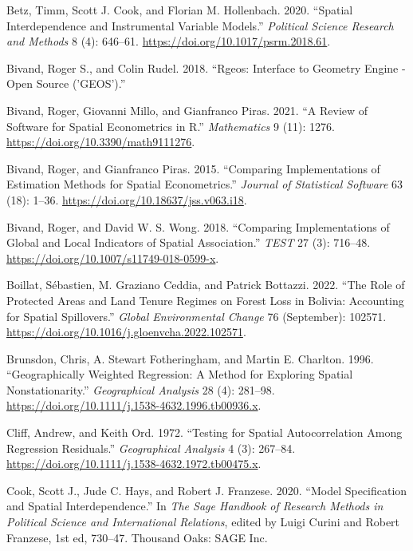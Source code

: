 \documentclass[
  letterpaper,
  DIV=11,
  numbers=noendperiod]{scrreprt}
\newlength{\cslhangindent}
\newlength{\cslentryspacingunit} %
\newenvironment{CSLReferences}[2] %
 {%
  \setlength{\parindent}{0pt}
  \ifodd #1
  \let\oldpar\par
  \def\par{\hangindent=\cslhangindent\oldpar}
  \fi
  \setlength{\parskip}{#2\cslentryspacingunit}
 }%
 {}
\begin{document}
\begin{CSLReferences}{1}{0}
\leavevmode{}%
Betz, Timm, Scott J. Cook, and Florian M. Hollenbach. 2020. {``Spatial
Interdependence and Instrumental Variable Models.''} \emph{Political
Science Research and Methods} 8 (4): 646--61.
\url{https://doi.org/10.1017/psrm.2018.61}.

\leavevmode{}%
Bivand, Roger S., and Colin Rudel. 2018. {``Rgeos: {Interface} to
{Geometry Engine} - {Open Source} ('{GEOS}').''}

\leavevmode{}%
Bivand, Roger, Giovanni Millo, and Gianfranco Piras. 2021. {``A {Review}
of {Software} for {Spatial Econometrics} in {R}.''} \emph{Mathematics} 9
(11): 1276. \url{https://doi.org/10.3390/math9111276}.

\leavevmode{}%
Bivand, Roger, and Gianfranco Piras. 2015. {``Comparing
{Implementations} of {Estimation Methods} for {Spatial Econometrics}.''}
\emph{Journal of Statistical Software} 63 (18): 1--36.
\url{https://doi.org/10.18637/jss.v063.i18}.

\leavevmode{}%
Bivand, Roger, and David W. S. Wong. 2018. {``Comparing Implementations
of Global and Local Indicators of Spatial Association.''} \emph{TEST} 27
(3): 716--48. \url{https://doi.org/10.1007/s11749-018-0599-x}.

\leavevmode{}%
Boillat, Sébastien, M. Graziano Ceddia, and Patrick Bottazzi. 2022.
{``The Role of Protected Areas and Land Tenure Regimes on Forest Loss in
{Bolivia}: {Accounting} for Spatial Spillovers.''} \emph{Global
Environmental Change} 76 (September): 102571.
\url{https://doi.org/10.1016/j.gloenvcha.2022.102571}.

\leavevmode{}%
Brunsdon, Chris, A. Stewart Fotheringham, and Martin E. Charlton. 1996.
{``Geographically {Weighted Regression}: {A Method} for {Exploring
Spatial Nonstationarity}.''} \emph{Geographical Analysis} 28 (4):
281--98. \url{https://doi.org/10.1111/j.1538-4632.1996.tb00936.x}.

\leavevmode{}%
Cliff, Andrew, and Keith Ord. 1972. {``Testing for {Spatial
Autocorrelation Among Regression Residuals}.''} \emph{Geographical
Analysis} 4 (3): 267--84.
\url{https://doi.org/10.1111/j.1538-4632.1972.tb00475.x}.

\leavevmode{}%
Cook, Scott J., Jude C. Hays, and Robert J. Franzese. 2020. {``Model
{Specification} and {Spatial Interdependence}.''} In \emph{The {Sage}
Handbook of Research Methods in Political Science and International
Relations}, edited by Luigi Curini and Robert Franzese, 1st ed, 730--47.
{Thousand Oaks}: {SAGE Inc}.


\end{CSLReferences}
\end{document}
